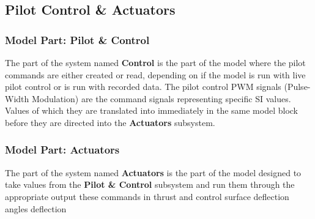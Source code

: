 \subsection{Pilot Control	 \& Actuators}

\subsubsection{Model Part: Pilot \& Control}

The part of the system named \textbf{Control} is the part of the model where the pilot commands are either created or read, depending on if the model is run with live pilot control or is run with recorded data. The pilot control PWM signals (Pulse-Width Modulation) are the command signals representing specific SI values. Values of which they are translated into immediately in the same model block before they are directed into the \textbf{Actuators} subsystem.

\subsubsection{Model Part: Actuators}

The part of the system named \textbf{Actuators} is the part of the model designed to take values from the \textbf{Pilot \& Control} subsystem and run them through the appropriate  output these commands in thrust and control surface deflection angles deflection


